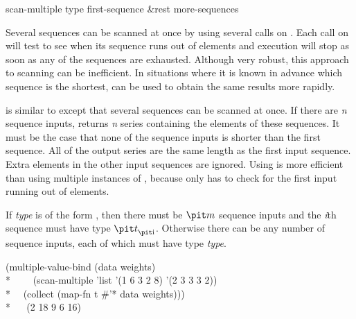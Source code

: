 \begin{defun}[Function]
scan-multiple type first-sequence &rest more-sequences

Several sequences can be scanned at once by using several calls on
.  Each call on  will test to see when its sequence runs
out of elements and execution will stop as soon as any of the sequences are
exhausted.  Although very robust, this approach to scanning can be
inefficient.  In situations where it is known in
advance which sequence is the shortest,  can be used to
obtain the same results more rapidly.
  
 is similar to  except that several sequences
can be scanned at once.  If there are {\it n} sequence inputs,
 returns {\it n} series containing the elements of these
sequences.  It must be the case that none of the sequence inputs is shorter
than the first sequence.  All of the output series are the same length as
the first input sequence.  Extra elements in the other input sequences are
ignored.  Using  is more efficient than using multiple
instances of , because  only has to check for
the first input running out of elements.

If {\it type} is of the form , then
there must be ${\it m}$ sequence inputs and the {\it i\/}th sequence must have type
${\it t}_{\hbox{\scriptsize\it i}}$.  Otherwise there can be any number of sequence inputs, each of which
must have type {\it type}.
\begin{lisp}
(multiple-value-bind (data weights) \\*
~~~~(scan-multiple 'list '(1 6 3 2 8) '(2 3 3 3 2)) \\*
~~(collect (map-fn t \#'* data weights))) \\*
~~{\EV} (2 18 9 6 16)
\end{lisp}
\end{defun}

